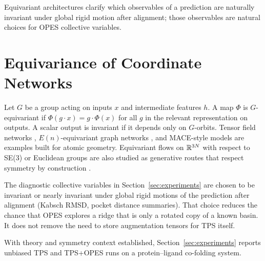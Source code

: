 Equivariant architectures clarify which observables of a prediction are naturally invariant under global rigid motion after alignment; those observables are natural choices for OPES collective variables.

\section{Equivariance of Coordinate Networks}
\label{sec:equivariance}

Let $G$ be a group acting on inputs $x$ and intermediate features $h$. A map $\Phi$ is $G$-equivariant if $\Phi(g \cdot x) = g \cdot \Phi(x)$ for all $g$ in the relevant representation on outputs. A scalar output is invariant if it depends only on $G$-orbits. Tensor field networks \citep{thomas2018}, $E(n)$-equivariant graph networks \citep{satorras2021}, and MACE-style models \citep{batzner2022} are examples built for atomic geometry. Equivariant flows on $\mathbb{R}^{3N}$ with respect to SE(3) or Euclidean groups are also studied as generative routes that respect symmetry by construction \citep{kohler2020equivariant,hoogeboom2022}.

The diagnostic collective variables in Section~\ref{sec:experiments} are chosen to be invariant or nearly invariant under global rigid motions of the prediction after alignment (Kabsch RMSD, pocket distance summaries). That choice reduces the chance that OPES explores a ridge that is only a rotated copy of a known basin. It does not remove the need to store augmentation tensors for TPS itself.

With theory and symmetry context established, Section~\ref{sec:experiments}
reports unbiased TPS and TPS+OPES runs on a protein--ligand co-folding system.
